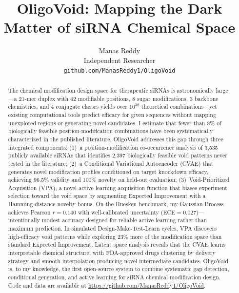 \documentclass{article}
\title{OligoVoid: Mapping the Dark Matter of siRNA Chemical Space}
\author{
  Manas Reddy \\
  Independent Researcher \\
  \texttt{github.com/ManasReddy1/OligoVoid}
}
\begin{document}
\maketitle


\begin{abstract}
The chemical modification design space for therapeutic siRNAs is astronomically large---a 21-mer duplex with 42 modifiable positions, 8 sugar modifications, 3 backbone chemistries, and 4 conjugate classes yields over $10^{38}$ theoretical combinations---yet existing computational tools predict efficacy for given sequences without mapping unexplored regions or generating novel candidates.
I estimate that fewer than 8\% of biologically feasible position-modification combinations have been systematically characterized in the published literature.
OligoVoid addresses this gap through three integrated components:
(1)~a position-modification co-occurrence analysis of 3,535 publicly available siRNAs that identifies 2,397 biologically feasible void patterns never tested in the literature;
(2)~a Conditional Variational Autoencoder (CVAE) that generates novel modification profiles conditioned on target knockdown efficacy, achieving 96.5\% validity and 100\% novelty on held-out evaluation;
(3)~Void-Prioritized Acquisition (VPA), a novel active learning acquisition function that biases experiment selection toward the void space by augmenting Expected Improvement with a Hamming-distance novelty bonus.
On the Huesken benchmark, my Gaussian Process achieves Pearson $r=0.140$ with well-calibrated uncertainty (ECE$=0.027$)---intentionally modest accuracy designed for reliable active learning rather than maximum prediction.
In simulated Design-Make-Test-Learn cycles, VPA discovers high-efficacy void patterns while exploring 23\% more of the modification space than standard Expected Improvement.
Latent space analysis reveals that the CVAE learns interpretable chemical structure, with FDA-approved drugs clustering by delivery strategy and smooth interpolation producing novel intermediate candidates.
OligoVoid is, to my knowledge, the first open-source system to combine systematic gap detection, conditional generation, and active learning for siRNA chemical modification design.
Code and data are available at \url{https://github.com/ManasReddy1/OligoVoid}.
\end{abstract}
\end{document}
